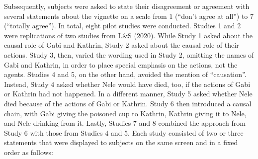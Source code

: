 \documentclass[egregdoesnotlikesansseriftitles,12pt]{scrartcl}
\begin{document}
\noindent Subsequently, subjects were asked to state their disagreement or agreement with several statements about the vignette on a scale from $1$ (``don't agree at all'') to $7$ (``totally agree''). In total, eight pilot studies were conducted. Studies 1 and 2 were replications of two studies from L\&S (2020). While Study 1 asked about the causal role of Gabi and Kathrin, Study 2 asked about the causal role of their actions. Study 3, then, varied the wording used in Study 2, omitting the names of Gabi and Kathrin, in order to place special emphasis on the actions, not the agents. Studies 4 and 5, on the other hand, avoided the mention of ``causation''. Instead, Study 4 asked whether Nele would have died, too, if the actions of Gabi or Kathrin had not happened. In a different manner, Study 5 asked whether Nele died because of the actions of Gabi or Kathrin. Study 6 then introduced a causal chain, with Gabi giving the poisoned cup to Kathrin, Kathrin giving it to Nele, and Nele drinking from it. Lastly, Studies 7 and 8 combined the approach from Study 6 with those from Studies 4 and 5. Each study consisted of two or three statements that were displayed to subjects on the same screen and in a fixed order as follows:
\end{document}
